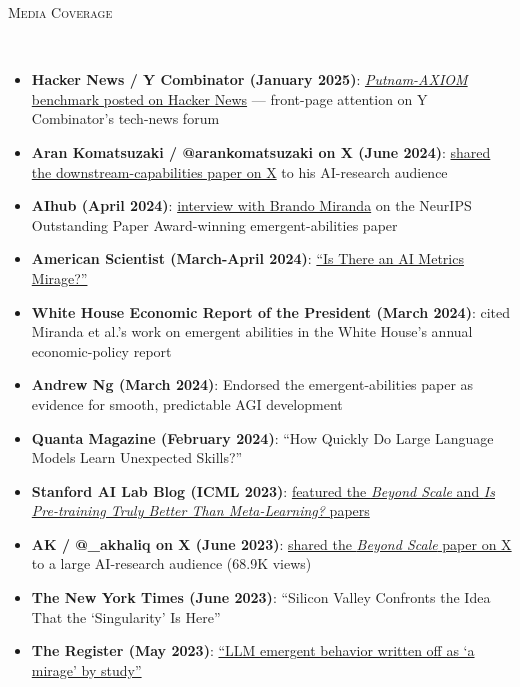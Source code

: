 \documentclass{article}
\newenvironment{changemargin}[2]{%
  \begin{list}{}{%
    \setlength{\topsep}{0pt}%
    \setlength{\leftmargin}{#1}%
    \setlength{\rightmargin}{#2}%
    \setlength{\listparindent}{\parindent}%
    \setlength{\itemindent}{\parindent}%
    \setlength{\parsep}{\parskip}%
  }%
  \item[]}{\end{list}
}
\newcommand{\lineover}{
	\begin{changemargin}{-0.05in}{-0.05in}
		\vspace*{-8pt}
		\hrulefill \\
		\vspace*{-2pt}
	\end{changemargin}
}
\newcommand{\header}[1]{
	\begin{changemargin}{-0.5in}{-0.5in}
		\scshape{#1}\\
  	\lineover
	\end{changemargin}
	\nopagebreak[4]    %
}
\newenvironment{body} {
		\vspace*{-16pt}
		\begin{changemargin}{-0.25in}{-0.5in}
	  }
		{\end{changemargin}\vspace{8pt plus 12pt}
	}
\begin{document}

\header{Media Coverage}
\begin{body}
\vspace{12pt}
\begin{itemize} \itemsep -2pt
    \item \textbf{Hacker News / Y Combinator (January 2025)}: \href{https://news.ycombinator.com/item?id=42565606}{\textit{Putnam-AXIOM} benchmark posted on Hacker News} --- front-page attention on Y Combinator's tech-news forum
    \item \textbf{Aran Komatsuzaki / @arankomatsuzaki on X (June 2024)}: \href{https://x.com/arankomatsuzaki/status/1799976398331011173}{shared the downstream-capabilities paper on X} to his AI-research audience
    \item \textbf{AIhub (April 2024)}: \href{https://aihub.org/2024/04/25/are-emergent-abilities-of-large-language-models-a-mirage-interview-with-brando-miranda/}{interview with Brando Miranda} on the NeurIPS Outstanding Paper Award-winning emergent-abilities paper
    \item \textbf{American Scientist (March-April 2024)}: \href{https://www.americanscientist.org/article/an-education-in-irrationality}{``Is There an AI Metrics Mirage?''}
    \item \textbf{White House Economic Report of the President (March 2024)}: cited Miranda et al.'s work on emergent abilities in the White House's annual economic-policy report
    \item \textbf{Andrew Ng (March 2024)}: Endorsed the emergent-abilities paper as evidence for smooth, predictable AGI development
    \item \textbf{Quanta Magazine (February 2024)}: ``How Quickly Do Large Language Models Learn Unexpected Skills?''
    \item \textbf{Stanford AI Lab Blog (ICML 2023)}: \href{https://ai.stanford.edu/blog/icml-2023/}{featured the \textit{Beyond Scale} and \textit{Is Pre-training Truly Better Than Meta-Learning?} papers}
    \item \textbf{AK / @\_akhaliq on X (June 2023)}: \href{https://x.com/_akhaliq/status/1673507375515594766}{shared the \textit{Beyond Scale} paper on X} to a large AI-research audience (68.9K views)
    \item \textbf{The New York Times (June 2023)}: ``Silicon Valley Confronts the Idea That the `Singularity' Is Here''
    \item \textbf{The Register (May 2023)}: \href{https://www.theregister.com/software/2023/05/16/llm-emergent-behavior-written-off-as-a-mirage-by-study/655184}{``LLM emergent behavior written off as `a mirage' by study''}

\end{itemize}
\end{body}
\end{document}
